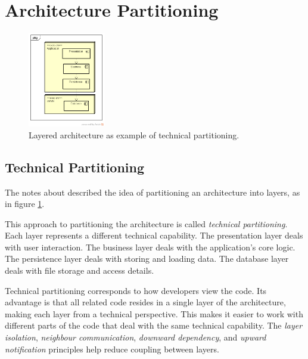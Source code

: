 \section{Architecture Partitioning}

\begin{figure}
    \vspace{-20pt}
    \centering
    \includegraphics[trim=74 58 40 41,clip,width=0.3\textwidth]{diagrams/technical-partitioning.png}
    \caption{Layered architecture as example of technical partitioning.}
    \label{fig:technical-partitioning}
\end{figure}

\subsection{Technical Partitioning}
The notes about 
described the idea of partitioning an architecture into layers, as in figure \ref{fig:technical-partitioning}.

This approach to partitioning the architecture is called \emph{technical partitioning}.
Each layer represents a different technical capability.
The presentation layer deals with user interaction.
The business layer deals with the application's core logic.
The persistence layer deals with storing and loading data.
The database layer deals with file storage and access details.

Technical partitioning corresponds to how developers view the code.
Its advantage is that all related code resides in a single layer of the architecture,
making each layer  from a technical perspective.
This makes it easier to work with different parts of the code that deal with the same technical capability.
The \emph{layer isolation}, \emph{neighbour communication}, \emph{downward dependency},
and \emph{upward notification} principles help reduce coupling between layers.

